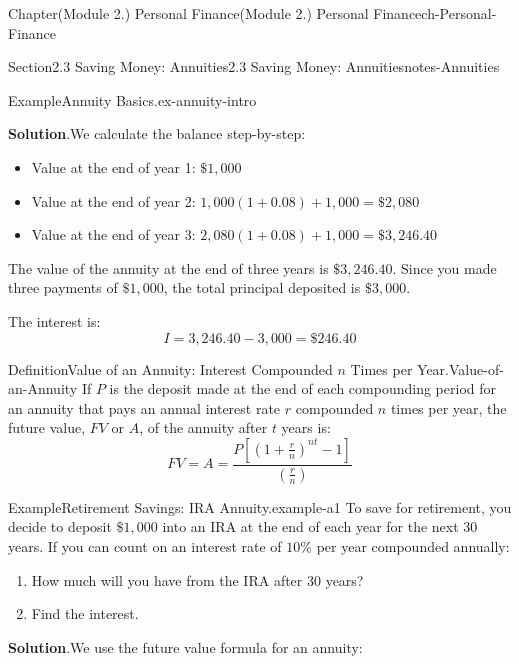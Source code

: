 \documentclass[oneside,10pt,]{book}
\newcommand{\blocktitlefont}{\relax}
\newcommand{\ptxlistdisc}{\raisebox{0.3ex}{\textbullet}}
\begin{document}
\begin{chapterptx}{Chapter}{(Module 2.) Personal Finance}{}{(Module 2.) Personal Finance}{}{}{ch-Personal-Finance}
\begin{sectionptx}{Section}{2.3 Saving Money: Annuities}{}{2.3 Saving Money: Annuities}{}{}{notes-Annuities}
\begin{example}{Example}{Annuity Basics.}{ex-annuity-intro}
%
\par\smallskip%
\noindent\textbf{\blocktitlefont Solution}.\hypertarget{ex-annuity-intro-3}{}\quad{}We calculate the balance step-by-step:%
\begin{itemize}[label=\ptxlistdisc]
\item{}Value at the end of year 1: \(\$1,000\)%
\item{}Value at the end of year 2: \(1,000(1+0.08) + 1,000 = \$2,080\)%
\item{}Value at the end of year 3: \(2,080(1+0.08) + 1,000 = \$3,246.40\)%
\end{itemize}
%
\par
The value of the annuity at the end of three years is \(\$3,246.40\). Since you made three payments of \(\$1,000\), the total principal deposited is \(\$3,000\).%
\par
The interest is:%
\begin{equation*}
I = 3,246.40 - 3,000 = \$246.40
\end{equation*}
%
\end{example}
\begin{definition}{Definition}{Value of an Annuity: Interest Compounded \(n\) Times per Year.}{Value-of-an-Annuity}%
If \(P\) is the deposit made at the end of each compounding period for an annuity that pays an annual interest rate \(r\) compounded \(n\) times per year, the future value, \(FV\) or \(A\), of the annuity after \(t\) years is:%
\begin{equation}
FV = A = \frac{P\left[\left(1+\frac{r}{n}\right)^{nt}-1\right]}{\left(\frac{r}{n}\right)}\label{annuity-formula}
\end{equation}
%
\end{definition}
\begin{example}{Example}{Retirement Savings: IRA Annuity.}{example-a1}%
To save for retirement, you decide to deposit \(\$1,000\) into an IRA at the end of each year for the next 30 years. If you can count on an interest rate of \(10\%\) per year compounded annually:%
\begin{enumerate}[label={\arabic*}]
\item{}How much will you have from the IRA after 30 years?%
\item{}Find the interest.%
\end{enumerate}
%
\par\smallskip%
\noindent\textbf{\blocktitlefont Solution}.\hypertarget{example-a1-3}{}\quad{}We use the future value formula for an annuity:%
\begin{equation*}

\end{equation*}
\end{example}
\end{sectionptx}
\end{chapterptx}
\end{document}
